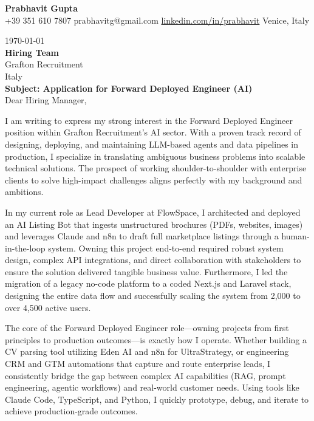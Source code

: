 \documentclass[11pt, a4paper]{article}
\begin{document}
\begin{center}
    {\huge \textbf{Prabhavit Gupta}} \\
    \vspace{0.1cm}
    +39 351 610 7807 \quad prabhavitg@gmail.com \quad \href{https://www.linkedin.com/in/prabhavit/}{linkedin.com/in/prabhavit} \quad Venice, Italy
\end{center}

\vspace{0.5cm}
\noindent \today \\

\noindent \textbf{Hiring Team} \\
Grafton Recruitment \\
Italy \\

\vspace{0.3cm}
\noindent \textbf{Subject: Application for Forward Deployed Engineer (AI)} \\

\noindent Dear Hiring Manager,

\vspace{0.2cm}
\noindent I am writing to express my strong interest in the Forward Deployed Engineer position within Grafton Recruitment's AI sector. With a proven track record of designing, deploying, and maintaining LLM-based agents and data pipelines in production, I specialize in translating ambiguous business problems into scalable technical solutions. The prospect of working shoulder-to-shoulder with enterprise clients to solve high-impact challenges aligns perfectly with my background and ambitions.

\vspace{0.2cm}
\noindent In my current role as Lead Developer at FlowSpace, I architected and deployed an AI Listing Bot that ingests unstructured brochures (PDFs, websites, images) and leverages Claude and n8n to draft full marketplace listings through a human-in-the-loop system. Owning this project end-to-end required robust system design, complex API integrations, and direct collaboration with stakeholders to ensure the solution delivered tangible business value. Furthermore, I led the migration of a legacy no-code platform to a coded Next.js and Laravel stack, designing the entire data flow and successfully scaling the system from 2,000 to over 4,500 active users.

\vspace{0.2cm}
\noindent The core of the Forward Deployed Engineer role---owning projects from first principles to production outcomes---is exactly how I operate. Whether building a CV parsing tool utilizing Eden AI and n8n for UltraStrategy, or engineering CRM and GTM automations that capture and route enterprise leads, I consistently bridge the gap between complex AI capabilities (RAG, prompt engineering, agentic workflows) and real-world customer needs. Using tools like Claude Code, TypeScript, and Python, I quickly prototype, debug, and iterate to achieve production-grade outcomes.
\end{document}

